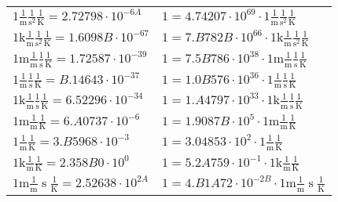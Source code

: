 \begin{center}
\begin{longtable}{l l}
{\color{black}$1 \bm{\mathrm{ }}\frac1{\operatorname{m}}\frac1{\operatorname{s}^2}{}\frac1{\operatorname{K}} = 2.72798\cdot10^{-6A} $}   & {\color{black}$ 1 = 4.74207\cdot10^{69} \cdot 1 \bm{\mathrm{ }}\frac1{\operatorname{m}}\frac1{\operatorname{s}^2}{}\frac1{\operatorname{K}}$}  \\
{\color{gray}$1 \bm{\mathrm{ k}}\frac1{\operatorname{m}}\frac1{\operatorname{s}^2}{}\frac1{\operatorname{K}} = 1.6098B\cdot10^{-67} $}   & {\color{gray}$ 1 = 7.B782B\cdot10^{66} \cdot 1 \bm{\mathrm{ k}}\frac1{\operatorname{m}}\frac1{\operatorname{s}^2}{}\frac1{\operatorname{K}}$}  \\
{\color{gray}$1 \bm{\mathrm{ m}}\frac1{\operatorname{m}}\frac1{\operatorname{s}}{}\frac1{\operatorname{K}} = 1.72587\cdot10^{-39} $}   & {\color{gray}$ 1 = 7.5B786\cdot10^{38} \cdot 1 \bm{\mathrm{ m}}\frac1{\operatorname{m}}\frac1{\operatorname{s}}{}\frac1{\operatorname{K}}$}  \\
{\color{black}$1 \bm{\mathrm{ }}\frac1{\operatorname{m}}\frac1{\operatorname{s}}{}\frac1{\operatorname{K}} = B.14643\cdot10^{-37} $}   & {\color{black}$ 1 = 1.0B576\cdot10^{36} \cdot 1 \bm{\mathrm{ }}\frac1{\operatorname{m}}\frac1{\operatorname{s}}{}\frac1{\operatorname{K}}$}  \\
{\color{gray}$1 \bm{\mathrm{ k}}\frac1{\operatorname{m}}\frac1{\operatorname{s}}{}\frac1{\operatorname{K}} = 6.52296\cdot10^{-34} $}   & {\color{gray}$ 1 = 1.A4797\cdot10^{33} \cdot 1 \bm{\mathrm{ k}}\frac1{\operatorname{m}}\frac1{\operatorname{s}}{}\frac1{\operatorname{K}}$}  \\
{\color{gray}$1 \bm{\mathrm{ m}}\frac1{\operatorname{m}}{}{}\frac1{\operatorname{K}} = 6.A0737\cdot10^{-6} $}   & {\color{gray}$ 1 = 1.9087B\cdot10^{5} \cdot 1 \bm{\mathrm{ m}}\frac1{\operatorname{m}}{}{}\frac1{\operatorname{K}}$}  \\
{\color{black}$1 \bm{\mathrm{ }}\frac1{\operatorname{m}}{}{}\frac1{\operatorname{K}} = 3.B5968\cdot10^{-3} $}   & {\color{black}$ 1 = 3.04853\cdot10^{2} \cdot 1 \bm{\mathrm{ }}\frac1{\operatorname{m}}{}{}\frac1{\operatorname{K}}$}  \\
{\color{gray}$1 \bm{\mathrm{ k}}\frac1{\operatorname{m}}{}{}\frac1{\operatorname{K}} = 2.358B0\cdot10^{0} $}   & {\color{gray}$ 1 = 5.2A759\cdot10^{-1} \cdot 1 \bm{\mathrm{ k}}\frac1{\operatorname{m}}{}{}\frac1{\operatorname{K}}$}  \\
{\color{gray}$1 \bm{\mathrm{ m}}\frac1{\operatorname{m}}{\operatorname{s}}{}\frac1{\operatorname{K}} = 2.52638\cdot10^{2A} $}   & {\color{gray}$ 1 = 4.B1A72\cdot10^{-2B} \cdot 1 \bm{\mathrm{ m}}\frac1{\operatorname{m}}{\operatorname{s}}{}\frac1{\operatorname{K}}$}  \\

\end{longtable}
\end{center}
